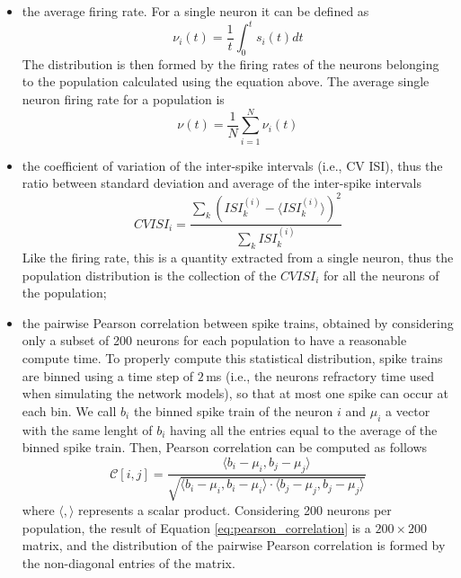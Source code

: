 \documentclass[a4paper, 12pt, twoside, openright]{book}
\begin{document}
\begin{itemize}
    \item the average firing rate. For a single neuron it can be defined as
    \begin{equation}
        \nu_i (t) = \dfrac{1}{t}\int_{0}^{t} s_i(t) dt
    \end{equation}
    The distribution is then formed by the firing rates of the neurons belonging to the population calculated using the equation above. The average single neuron firing rate for a population is
    \begin{equation}
        \nu (t) = \dfrac{1}{N}\sum_{i=1}^{N} \nu_i (t)
    \end{equation}
    \item the coefficient of variation of the inter-spike intervals (i.e., CV ISI), thus the ratio between standard deviation and average of the inter-spike intervals
    \begin{equation}
    \label{eq:cvisi}
        CVISI_i = \dfrac{\sum_k (ISI_k^{(i)} - \langle ISI_k^{(i)} \rangle)^2}{\sum_k ISI_k^{(i)}}
    \end{equation}
    Like the firing rate, this is a quantity extracted from a single neuron, thus the population distribution is the collection of the $CVISI_i$ for all the neurons of the population;
    \item the pairwise Pearson correlation between spike trains, obtained by considering only a subset of 200 neurons for each population to have a reasonable compute time. To properly compute this statistical distribution, spike trains are binned using a time step of $2$\,ms (i.e., the neurons refractory time used when simulating the network models), so that at most one spike can occur at each bin. We call $b_i$ the binned spike train of the neuron $i$ and $\mu_i$ a vector with the same lenght of $b_i$ having all the entries equal to the average of the binned spike train. Then, Pearson correlation can be computed as follows
    \begin{equation}
    \label{eq:pearson_correlation}
        \mathcal{C}[i,j]=\dfrac{\langle b_i-\mu_i, b_j-\mu_j \rangle}{\sqrt{ \langle b_i-\mu_i, b_i-\mu_i \rangle \cdot \langle b_j-\mu_j, b_j-\mu_j \rangle}}
    \end{equation}
    where $\langle , \rangle$ represents a scalar product. Considering 200 neurons per population, the result of Equation \eqref{eq:pearson_correlation} is a $200\times 200$ matrix, and the distribution of the pairwise Pearson correlation is formed by the non-diagonal entries of the matrix.
\end{itemize}
\end{document}
